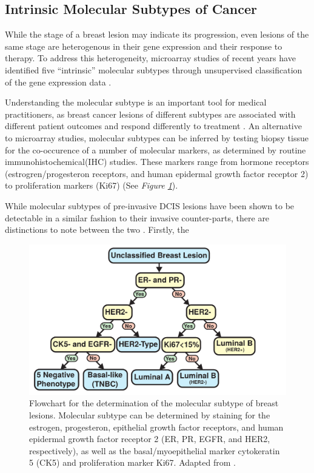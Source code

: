 \subsection{Intrinsic Molecular Subtypes of Cancer}

While the stage of a breast lesion may indicate its progression, even lesions of the same stage are heterogenous in their gene expression and their response to therapy. To address this heterogeneity, microarray studies of recent years have identified five ``intrinsic'' molecular subtypes through unsupervised classification of the gene expression data \citep{perou2000,prat2015}. \par

Understanding the molecular subtype is an important tool for medical practitioners, as breast cancer lesions of different subtypes are associated with different patient outcomes and respond differently to treatment \citep{engstrom2013,rouzier2005}. An alternative to microarray studies, molecular subtypes can be inferred by testing biopsy tissue for the co-occurence of a number of molecular markers, as determined by routine immunohistochemical(IHC) studies. These markers range from hormone receptors (estrogren/progesteron receptors, and human epidermal growth factor receptor 2) to proliferation markers (Ki67) (See \emph{Figure \ref{subtype_flowchart}}).

While molecular subtypes of pre-invasive DCIS lesions have been shown to be detectable in a similar fashion to their invasive counter-parts, there are distinctions to note between the two \citep{tamimi2008,clark2011}. Firstly, the  

\begin{figure}[ht!]
	\centering
	\includegraphics[width=150mm]{figures/subtype_flowchart.pdf}
	\caption{Flowchart for the determination of the molecular subtype of breast lesions. Molecular subtype can be determined by staining for the estrogen, progesteron, epithelial growth factor receptors, and human epidermal growth factor receptor 2 (ER, PR, EGFR, and HER2, respectively), as well as the basal/myoepithelial marker cytokeratin 5 (CK5) and proliferation marker Ki67. Adapted from \cite{engstrom2013}. \label{subtype_flowchart}}
\end{figure}